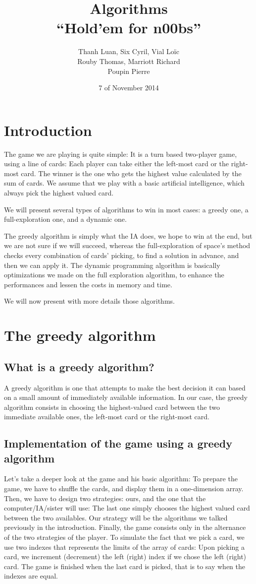 \documentclass[11pt]{article}
\title{Algorithms \\
	\textbf{``Hold'em for n00bs''}}
\author{Thanh Luan, Six Cyril, Vial Loïc \\
			Rouby Thomas, Marriott Richard\\
			Poupin Pierre}
\date{7\up{th} of November 2014}
\begin{document}
\maketitle

\section{Introduction}
The game we are playing is quite simple: It is a turn based two-player game, using a line of cards: Each player can take either the left-most card or the right-most card.
The winner is the one who gets the highest value calculated by the sum of cards.
We assume that we play with a basic artificial intelligence, which always pick the highest valued card.

We will present several types of algorithms to win in most cases: a greedy one, a full-exploration one, and a dynamic one.

The greedy algorithm is simply what the IA does, we hope to win at the end, but we are not sure if we will succeed, whereas the full-exploration of space's method checks every combination of cards' picking, to find a solution in advance, and then we can apply it.
The dynamic programming algorithm is basically optimizations we made on the full exploration algorithm, to enhance the performances and lessen the costs in memory and time.

We will now present with more details those algorithms.


\section{The greedy algorithm}
\subsection{What is a greedy algorithm?}

A greedy algorithm is one that attempts to make the best decision it can based on a small amount of immediately available information.
In our case, the greedy algorithm consists in  choosing the highest-valued card between the two immediate available ones, the left-most card or the right-most card.

\subsection{Implementation of the game using a greedy algorithm}
Let's take a deeper look at the game and his basic algorithm:
To prepare the game, we have to shuffle the cards, and display them in a one-dimension array.
Then, we have to design two strategies: ours, and the one that the computer/IA/sister will use: The last one simply chooses the highest valued card between the two availables.
Our strategy will be the algorithms we talked previously in the introduction.
Finally, the game consists only in the alternance of the two strategies of the player.
To simulate the fact that we pick a card, we use two indexes that represents the limits of the array of cards: Upon picking a card, we increment (decrement) the left (right) index if we chose the left (right) card. The game is finished when the last card is picked, that is to say when the indexes are equal.
\end{document}
